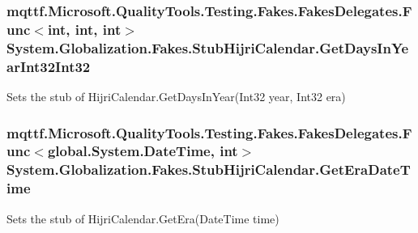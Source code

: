 \hypertarget{class_system_1_1_globalization_1_1_fakes_1_1_stub_hijri_calendar_a0eedfe389452d8f4df6955cb44898678}{
\subsubsection[{Get\-Days\-In\-Year\-Int32\-Int32}]{\setlength{\rightskip}{0pt plus 5cm}mqttf.\-Microsoft.\-Quality\-Tools.\-Testing.\-Fakes.\-Fakes\-Delegates.\-Func$<$int, int, int$>$ System.\-Globalization.\-Fakes.\-Stub\-Hijri\-Calendar.\-Get\-Days\-In\-Year\-Int32\-Int32}}\label{class_system_1_1_globalization_1_1_fakes_1_1_stub_hijri_calendar_a0eedfe389452d8f4df6955cb44898678}


Sets the stub of Hijri\-Calendar.\-Get\-Days\-In\-Year(\-Int32 year, Int32 era)

\hypertarget{class_system_1_1_globalization_1_1_fakes_1_1_stub_hijri_calendar_ab91115c1bf5588aaf49b240c07b10f12}{
\subsubsection[{Get\-Era\-Date\-Time}]{\setlength{\rightskip}{0pt plus 5cm}mqttf.\-Microsoft.\-Quality\-Tools.\-Testing.\-Fakes.\-Fakes\-Delegates.\-Func$<$global.\-System.\-Date\-Time, int$>$ System.\-Globalization.\-Fakes.\-Stub\-Hijri\-Calendar.\-Get\-Era\-Date\-Time}}\label{class_system_1_1_globalization_1_1_fakes_1_1_stub_hijri_calendar_ab91115c1bf5588aaf49b240c07b10f12}


Sets the stub of Hijri\-Calendar.\-Get\-Era(\-Date\-Time time)

